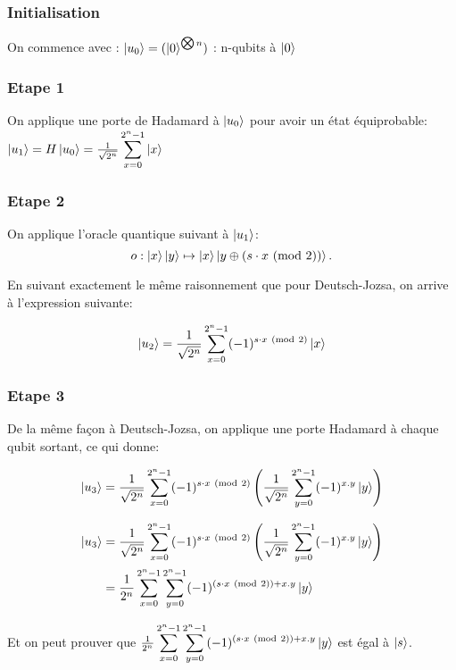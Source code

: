 \subsubsection{Initialisation}
On commence avec :
$\ket{u_0} = (\ket{0}^{\bigotimes n})$
: n-qubits à $\ket{0}$

\subsubsection{Etape 1}

On applique une porte de Hadamard à $\ket{u_0}$ pour avoir un état équiprobable:
$\ket{u_1} = H\ket{u_0} = \frac{1}{\sqrt{2^n}}
\displaystyle\sum_{x=0}^{2^n-1} \ket{x}$

\subsubsection{Etape 2}
On applique l'oracle quantique suivant à $\ket{u_1}$:
\[ o : \ket{x}\ket{y}\mapsto \ket{x}\ket{y\oplus (s \cdot x \ (\mathrm{mod}\ 2))}. \]

En suivant exactement le même raisonnement que pour Deutsch-Jozsa, on arrive à l'expression suivante: 

\begin{equation}\ket{u_2} = \frac{1}{\sqrt{2^n}}
\displaystyle\sum_{x=0}^{2^n-1} (-1)^{s \cdot x \ (\mathrm{mod}\ 2)}\ket{x} 
\end{equation}

\subsubsection{Etape 3}

De la même façon à Deutsch-Jozsa, on applique une porte Hadamard à chaque qubit sortant, ce qui donne:

\[ \ket{u_3} = \frac{1}{\sqrt{2^{n}}}
\displaystyle\sum_{x=0}^{2^n-1} (-1)^{s \cdot x \ (\mathrm{mod}\ 2)} \left( \frac{1}{\sqrt{2^{n}}} \displaystyle\sum_{y=0}^{2^n-1} (-1)^{x.y}\ket{y} \right) \]

\begin{align}
  \ket{u_3} &= \frac{1}{\sqrt{2^{n}}}\displaystyle\sum_{x=0}^{2^n-1} (-1)^{s \cdot x \ (\mathrm{mod}\ 2)} \left( \frac{1}{\sqrt{2^{n}}} \displaystyle\sum_{y=0}^{2^n-1} (-1)^{x.y}\ket{y} \right) \\
  & = \frac{1}{2^{n}} \displaystyle\sum_{x=0}^{2^n-1} \displaystyle\sum_{y=0}^{2^n-1} (-1)^{(s \cdot x \ (\mathrm{mod}\ 2)) + x.y} \ket{y}
  \end{align}

Et on peut prouver que $\frac{1}{2^{n}} \displaystyle\sum_{x=0}^{2^n-1} \displaystyle\sum_{y=0}^{2^n-1} (-1)^{(s \cdot x \ (\mathrm{mod}\ 2)) + x.y} \ket{y}$ est égal à $\ket{s}$.

